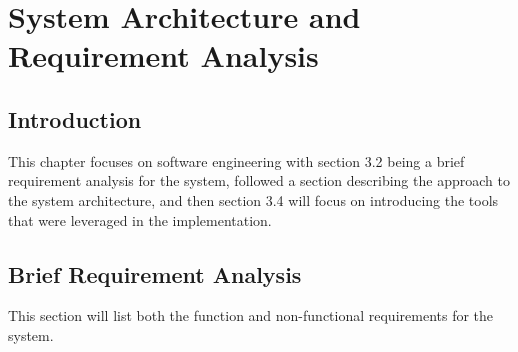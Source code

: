 \chapter{System Architecture and Requirement Analysis}
\label{chap:sys-arch}

\section{Introduction}
\label{chap3:sec:intro}
This chapter focuses on software engineering with section 3.2 being a brief
requirement analysis for the system, followed a section describing the approach
to the system architecture, and then section 3.4 will focus on introducing the
tools that were leveraged in the implementation.

\section{Brief Requirement Analysis}
\label{chap3:sec:reqs}

This section will list both the function and non-functional requirements for the
system.

